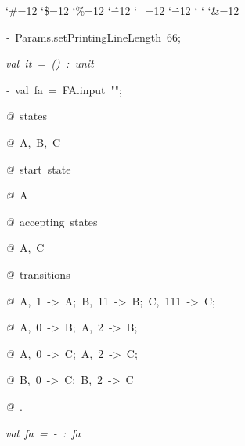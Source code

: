 \begin{list}{}
{\setlength{\leftmargin}{\leftmargini}
\setlength{\rightmargin}{0cm}
\setlength{\itemindent}{0cm}
\setlength{\listparindent}{0cm}
\setlength{\itemsep}{0cm}
\setlength{\parsep}{0cm}
\setlength{\labelsep}{0cm}
\setlength{\labelwidth}{0cm}
\catcode`\#=12
\catcode`\$=12
\catcode`\%=12
\catcode`\^=12
\catcode`\_=12
\catcode`\.=12
\catcode`
\catcode`
\catcode`\&=12
\ttfamily}
\small
\item[]\textsl{-\ }Params.setPrintingLineLength\ 66;
\item[]\textsl{val\ it\ =\ ()\ :\ unit}
\item[]\textsl{-\ }val\ fa\ =\ FA.input\ "";
\item[]\textsl{@\ }states
\item[]\textsl{@\ }A,\ B,\ C
\item[]\textsl{@\ }start\ state
\item[]\textsl{@\ }A
\item[]\textsl{@\ }accepting\ states
\item[]\textsl{@\ }A,\ C
\item[]\textsl{@\ }transitions
\item[]\textsl{@\ }A,\ 1\ ->\ A;\ B,\ 11\ ->\ B;\ C,\ 111\ ->\ C;
\item[]\textsl{@\ }A,\ 0\ ->\ B;\ A,\ 2\ ->\ B;
\item[]\textsl{@\ }A,\ 0\ ->\ C;\ A,\ 2\ ->\ C;
\item[]\textsl{@\ }B,\ 0\ ->\ C;\ B,\ 2\ ->\ C
\item[]\textsl{@\ }.
\item[]\textsl{val\ fa\ =\ -\ :\ fa}
\end{list}
